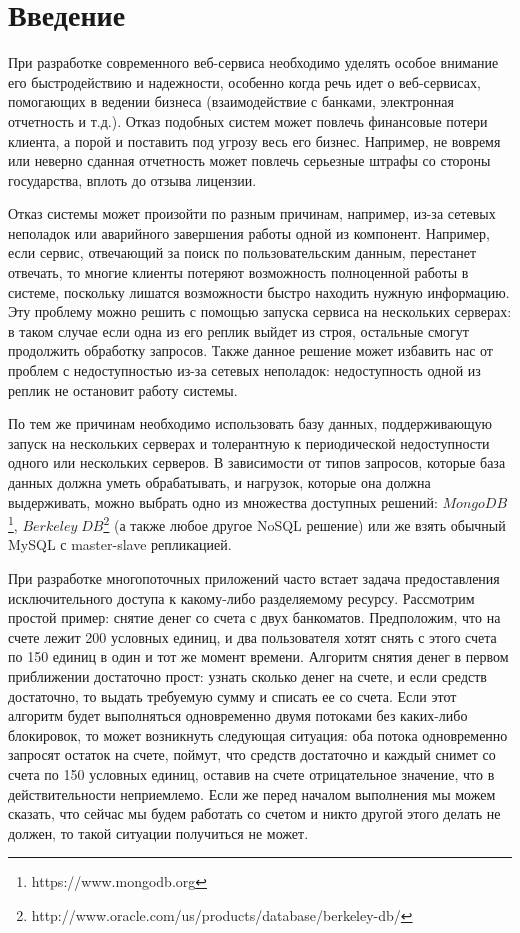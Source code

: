 \section{Введение}

При разработке современного веб-сервиса необходимо уделять особое внимание его быстродействию и надежности, особенно когда речь идет о веб-сервисах, помогающих в ведении бизнеса (взаимодействие с банками, электронная отчетность и т.д.). Отказ подобных систем может повлечь финансовые потери клиента, а порой и поставить под угрозу весь его бизнес. Например, не вовремя или неверно сданная отчетность может повлечь серьезные штрафы со стороны государства, вплоть до отзыва лицензии.

Отказ системы может произойти по разным причинам, например, из-за сетевых неполадок или аварийного завершения работы одной из компонент. Например, если сервис, отвечающий за поиск по пользовательским данным, перестанет отвечать, то многие клиенты потеряют возможность полноценной работы в системе, поскольку лишатся возможности быстро находить нужную информацию. Эту проблему можно решить с помощью запуска сервиса на нескольких серверах: в таком случае если одна из его реплик выйдет из строя, остальные смогут продолжить обработку запросов. Также данное решение может избавить нас от проблем с недоступностью из-за сетевых неполадок: недоступность одной из реплик не остановит работу системы.

По тем же причинам необходимо использовать базу данных, поддерживающую запуск на нескольких серверах и толерантную к периодической недоступности одного или нескольких серверов. В зависимости от типов запросов, которые база данных должна уметь обрабатывать, и нагрузок, которые она должна выдерживать, можно выбрать одно из множества доступных решений: $MongoDB$\footnote{https://www.mongodb.org}, $Berkeley\;DB$\footnote{http://www.oracle.com/us/products/database/berkeley-db/} (а также любое другое NoSQL решение) или же взять обычный MySQL с master-slave репликацией.

При разработке многопоточных приложений часто встает задача предоставления исключительного доступа к какому-либо разделяемому ресурсу. Рассмотрим простой пример: снятие денег со счета с двух банкоматов. Предположим, что на счете лежит 200 условных единиц, и два пользователя хотят снять с этого счета по 150 единиц в один и тот же момент времени. Алгоритм снятия денег в первом приближении достаточно прост: узнать сколько денег на счете, и если средств достаточно, то выдать требуемую сумму и списать ее со счета. Если этот алгоритм будет выполняться одновременно двумя потоками без каких-либо блокировок, то может возникнуть следующая ситуация: оба потока одновременно запросят остаток на счете, поймут, что средств достаточно и каждый снимет со счета по 150 условных единиц, оставив на счете отрицательное значение, что в действительности неприемлемо. Если же перед началом выполнения мы можем сказать, что сейчас мы будем работать со счетом и никто другой этого делать не должен, то такой ситуации получиться не может.

